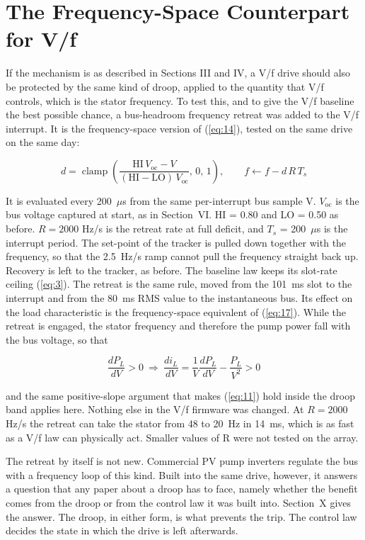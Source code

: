 \documentclass[journal]{IEEEtran}
\begin{document}
\section{The Frequency-Space Counterpart for V/f}

If the mechanism is as described in Sections III and IV, a V/f drive should also be protected by the same kind of droop, applied to the quantity that V/f controls, which is the stator frequency. To test this, and to give the V/f baseline the best possible chance, a bus-headroom frequency retreat was added to the V/f interrupt. It is the frequency-space version of (\ref{eq:14}), tested on the same drive on the same day:

\begin{equation}
d = \operatorname{clamp}\!\left(\frac{\mathrm{HI}\,V_{\mathrm{oc}} - V}{(\mathrm{HI}-\mathrm{LO})\,V_{\mathrm{oc}}},\,0,\,1\right),\qquad f \leftarrow f - d\,R\,T_s
\label{eq:20}
\end{equation}

It is evaluated every 200~$\mu$s from the same per-interrupt bus sample V. $V_{\mathrm{oc}}$ is the bus voltage captured at start, as in Section~VI. HI = 0.80 and LO = 0.50 as before. $R = 2000$ Hz/s is the retreat rate at full deficit, and $T_s$ = 200~$\mu$s is the interrupt period. The set-point of the tracker is pulled down together with the frequency, so that the 2.5~Hz/s ramp cannot pull the frequency straight back up. Recovery is left to the tracker, as before. The baseline law keeps its slot-rate ceiling (\ref{eq:3}). The retreat is the same rule, moved from the 101~ms slot to the interrupt and from the 80~ms RMS value to the instantaneous bus. Its effect on the load characteristic is the frequency-space equivalent of (\ref{eq:17}). While the retreat is engaged, the stator frequency and therefore the pump power fall with the bus voltage, so that

\begin{equation}
\frac{dP_L}{dV} > 0\ \Rightarrow\ \frac{di_L}{dV} = \frac{1}{V}\frac{dP_L}{dV} - \frac{P_L}{V^{2}} > 0
\label{eq:21}
\end{equation}

and the same positive-slope argument that makes (\ref{eq:11}) hold inside the droop band applies here. Nothing else in the V/f firmware was changed. At $R = 2000$ Hz/s the retreat can take the stator from 48 to 20~Hz in 14~ms, which is as fast as a V/f law can physically act. Smaller values of R were not tested on the array.

The retreat by itself is not new. Commercial PV pump inverters regulate the bus with a frequency loop of this kind. Built into the same drive, however, it answers a question that any paper about a droop has to face, namely whether the benefit comes from the droop or from the control law it was built into. Section~X gives the answer. The droop, in either form, is what prevents the trip. The control law decides the state in which the drive is left afterwards.
\end{document}
